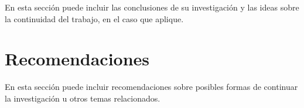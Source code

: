 \documentclass[a4paper,10pt,twocolumn]{article}
\begin{document}
  En esta sección puede incluir las conclusiones de su investigación y las ideas
  sobre la continuidad del trabajo, en el caso que aplique.


\section{Recomendaciones}\label{sec:rec}

  En esta sección puede incluir recomendaciones sobre posibles formas de continuar
  la investigación u otros temas relacionados.

\end{document}
